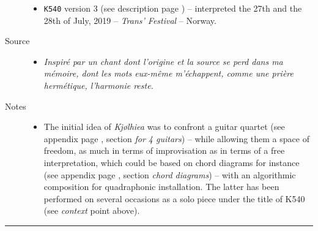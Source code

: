 \begin{description}
\begin{itemize}
\item \texttt{K540} version 3 (see description page \pageref{k540v3}) -- interpreted the 27th and the 28th of July, 2019 -- \textit{Trans' Festival}  -- Norway.
\end{itemize}
\item[Source] \hfill 
\begin{itemize}
\item[] \textit{Inspir\'{e} par un chant dont l'origine et la source se perd dans ma m\'{e}moire, dont les mots eux-m\^{e}me m'\'{e}chappent, comme une pri\`{e}re herm\'{e}tique, l'harmonie reste.}
\end{itemize}
\bigskip
\bigskip
\item[Notes] \hfill 
\begin{itemize}
\item[]  The initial idea of \textsl{Kj{\o}lhiea} was to confront a guitar quartet (see appendix page \pageref{kjccqg}, section \textsl{for 4 guitars}) -- while allowing them a space of freedom, as much in terms of improvisation as in terms of a free interpretation, which could be based on chord diagrams for instance (see appendix page \pageref{kjcccc}, section \textsl{chord diagrams}) -- with an algorithmic composition for quadraphonic installation. The latter has been performed on several occasions as a solo piece under the title of K540 (see \textsl{context} point above).
\end{itemize}

\end{description}


\bigskip

\begin{center}\rule{0.5\linewidth}{0.5pt}\end{center}

\bigskip

